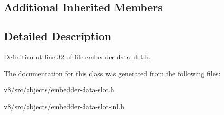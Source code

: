 \subsection*{Additional Inherited Members}


\subsection{Detailed Description}


Definition at line 32 of file embedder-\/data-\/slot.\+h.



The documentation for this class was generated from the following files\+:\begin{DoxyCompactItemize}
\item 
v8/src/objects/embedder-\/data-\/slot.\+h\item 
v8/src/objects/embedder-\/data-\/slot-\/inl.\+h\end{DoxyCompactItemize}
